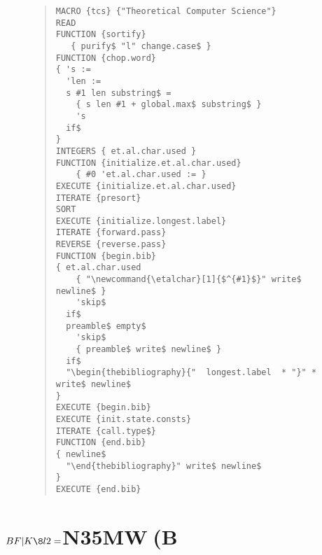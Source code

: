 \begin{figure}[h]
{\baselineskip=11pt
\begin{quote}
\begin{verbatim}
MACRO {tcs} {"Theoretical Computer Science"}  
READ
FUNCTION {sortify}
   { purify$ "l" change.case$ }
FUNCTION {chop.word}
{ 's :=
  'len :=
  s #1 len substring$ =
    { s len #1 + global.max$ substring$ }
    's
  if$
}
INTEGERS { et.al.char.used }
FUNCTION {initialize.et.al.char.used}
    { #0 'et.al.char.used := }
EXECUTE {initialize.et.al.char.used}
ITERATE {presort}
SORT
EXECUTE {initialize.longest.label}
ITERATE {forward.pass}
REVERSE {reverse.pass}
FUNCTION {begin.bib}
{ et.al.char.used
    { "\newcommand{\etalchar}[1]{$^{#1}$}" write$ newline$ }
    'skip$
  if$
  preamble$ empty$
    'skip$
    { preamble$ write$ newline$ }
  if$
  "\begin{thebibliography}{"  longest.label  * "}" * write$ newline$
}
EXECUTE {begin.bib}
EXECUTE {init.state.consts}
ITERATE {call.type$}
FUNCTION {end.bib}
{ newline$
  "\end{thebibliography}" write$ newline$
}
EXECUTE {end.bib}
\end{verbatim}
\end{quote}
}
\end{figure}
\section{$BF|K\8l2=$N35MW(B}
